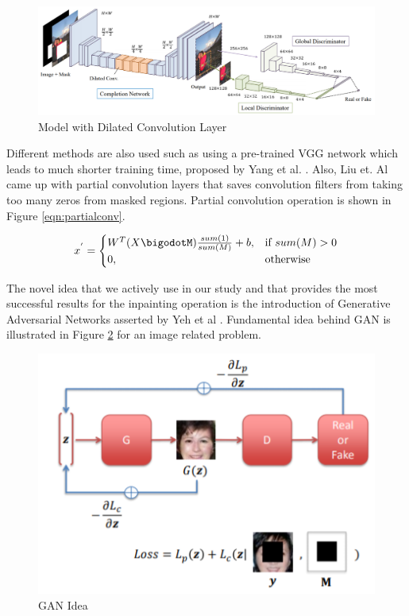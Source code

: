 \begin{figure}[h!]
    \centering
    \includegraphics[scale=0.35]{figures/chapter4/Lizukaetal.PNG}
    \vspace*{5mm}
    \caption{Model with Dilated Convolution Layer \cite{dilated_conv}}
    \label{fig:dilated-model}
\end{figure}

Different methods are also used such as using a pre-trained VGG network which leads to much shorter training time, proposed by Yang et al. \cite{inpainting_neuralpatch}. Also, Liu et. Al \cite{richer_conv_edge} came up with partial convolution layers that saves convolution filters from taking too many zeros from masked regions. Partial convolution operation is shown in Figure \ref{eqn:partialconv}.

\begin{equation}
\label{eqn:partialconv}
    x^{'}= {
\begin{cases}
    W^T (X\bigodotM) \frac{sum(1)}{sum(M)}+b,& \text{if } sum(M) > 0\\
    0,              & \text{otherwise}
\end{cases}
}
\end{equation}

The novel idea that we actively use in our study and that provides the most successful results for the inpainting operation is the introduction of Generative Adversarial Networks asserted by Yeh et al \cite{semantic_inpainting_geneative}. Fundamental idea behind GAN is illustrated in Figure \ref{fig:gan-idedal} for an image related problem.

\begin{figure}[h!]
    \centering
    \includegraphics[scale=0.7]{figures/chapter4/GANinpainting.PNG}
    \caption{GAN Idea \cite{semantic_inpainting_geneative}}
    \label{fig:gan-idedal}
\end{figure}

